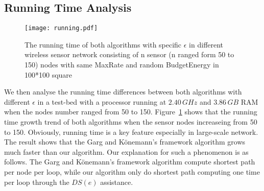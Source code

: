 \documentclass{article}
\begin{document}
\subsection{Running Time Analysis}
\begin{figure}[htbp]
\centering
\texttt{[image: running.pdf]}
\caption{The running time of both algorithms with specific $\epsilon$ in different wireless sensor network consisting of n sensor (n ranged form 50 to 150) nodes with same MaxRate and random BudgetEnergy in 100*100 square}
\label{fig:running}
\end{figure}
We then analyse the running time differences between both algorithms with different $\epsilon$ in a test-bed with a processor running at $2.40\,GHz$ and $3.86\,GB$ RAM when the nodes number ranged from 50 to 150.
Figure~\ref{fig:running} shows that the running time growth trend of both algorithms when the sensor nodes increaseing from 50 to 150. Obviously, running time is a key feature especially in large-scale network. The result shows that the Garg and K\"{o}nemann's framework algorithm
grows much faster than our algorithm. Our explanation for such a phenomenon is as follows. The Garg and K\"{o}nemann's framework algorithm compute shortest path per node per loop, while our algorithm only do shortest path computing one time per loop through the $DS(e)$ assistance.














\end{document}
